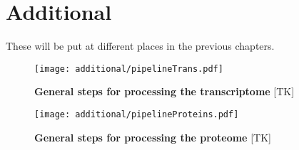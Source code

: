 \chapter{Additional}


These will be put at different places in the previous chapters.

\begin{figure}
    \texttt{[image: additional/pipelineTrans.pdf]}\centering
    \caption[General steps for processing the transcriptomic
    data]{\label{fig:pipelineTrans}\textbf{General steps for processing the
    transcriptome} [TK]}
\end{figure}

\begin{figure}
    \texttt{[image: additional/pipelineProteins.pdf]}\centering
    \caption[General steps for processing the proteome
    data]{\label{fig:pipelineProt}\textbf{General steps for processing the
    proteome} [TK] }
\end{figure}



